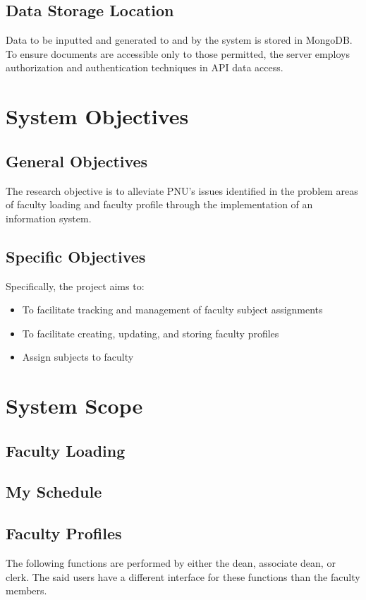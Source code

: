 \subsection{Data Storage Location}
Data to be inputted and generated to and by the system is stored in MongoDB. To ensure documents are accessible only to those permitted, the server employs authorization and authentication techniques in API data access.

\section{System Objectives}

    \subsection{General Objectives}
    The research objective is to alleviate PNU's issues identified in the problem areas of faculty loading and faculty profile through the implementation of an information system.
    
    \subsection{Specific Objectives}
    Specifically, the project aims to:
    
    \begin{itemize}
    \item{To facilitate tracking and management of faculty subject assignments}
    \item{To facilitate creating, updating, and storing faculty profiles}
    \item{Assign subjects to faculty}
    \end{itemize}

\section{System Scope}

    \subsection{Faculty Loading}
    
    \subsection{My Schedule}
        
    \subsection{Faculty Profiles}
    The following functions are performed by either the dean, associate dean, or clerk. The said users have a different interface for these functions than the faculty members.
    
